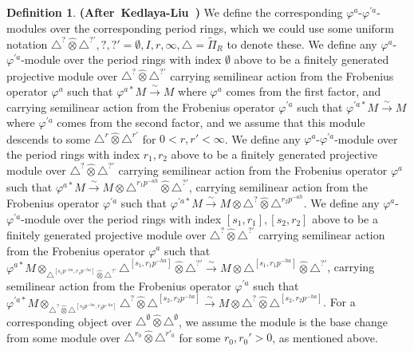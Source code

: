 \documentclass[12pt]{amsart}
\theoremstyle{definition}
\newtheorem{definition}[theorem]{Definition}
\numberwithin{equation}{section}
\begin{document}
\begin{definition} \mbox{\bf{(After Kedlaya-Liu \cite[Definition 4.4.4]{KL2})}}
We define the corresponding $\varphi^a$-$\varphi^{'a}$-modules over the corresponding period rings, which we could use some uniform notation $\triangle^?\widehat{\otimes}\triangle^{?'},?,?'=\emptyset,I,r,\infty,\triangle=\widetilde{\Pi}_{R}$ to denote these. We define any $\varphi^a$-$\varphi^{'a}$-module over the period rings with index $\emptyset$ above to be a finitely generated projective module over $\triangle^?\widehat{\otimes}\triangle^{?'}$ carrying semilinear action from the Frobenius operator $\varphi^a$ such that $\varphi^{a*}M\overset{\sim}{\rightarrow}M$ where $\varphi^a$ comes from the first factor, and carrying semilinear action from the Frobenius operator $\varphi^{'a}$ such that $\varphi^{'a*}M\overset{\sim}{\rightarrow}M$ where $\varphi^{'a}$ comes from the second factor, and we assume that this module descends to some $\triangle^r\widehat{\otimes}\triangle^{r'}$ for $0<r,r'<\infty$. We define any $\varphi^a$-$\varphi^{'a}$-module over the period rings with index $r_1,r_2$ above to be a finitely generated projective module over $\triangle^?\widehat{\otimes}\triangle^{?'}$ carrying semilinear action from the Frobenius operator $\varphi^a$ such that $\varphi^{a*}M\overset{\sim}{\rightarrow}M\otimes \triangle^{r_1p^{-ah}}\widehat{\otimes}\triangle^{?'}$, carrying semilinear action from the Frobenius operator $\varphi^{'a}$ such that $\varphi^{'a*}M\overset{\sim}{\rightarrow}M\otimes \triangle^?\widehat{\otimes}\triangle^{r_2p^{-ah}}$. We define any $\varphi^a$-$\varphi^{'a}$-module over the period rings with index $[s_1,r_1],[s_2,r_2]$ above to be a finitely generated projective module over $\triangle^?\widehat{\otimes}\triangle^{?'}$ carrying semilinear action from the Frobenius operator $\varphi^a$ such that $\varphi^{a*}M\otimes_{\triangle^{[s_1p^{-ha},r_1p^{-ha}]}\widehat{\otimes}\triangle^{?'}} \triangle^{[s_1,r_1p^{-ha}]} \widehat{\otimes}\triangle^{?'}\overset{\sim}{\rightarrow}M\otimes \triangle^{[s_1,r_1p^{-ha}]}\widehat{\otimes}\triangle^{?'}$, carrying semilinear action from the Frobenius operator $\varphi^{'a}$ such that $\varphi^{'a*}M\otimes_{\triangle^?\widehat{\otimes}\triangle^{[s_2p^{-ha},r_2p^{-ha}]}} \triangle^?\widehat{\otimes}\triangle^{[s_2,r_2p^{-ha}]}\overset{\sim}{\rightarrow}M\otimes \triangle^?\widehat{\otimes}\triangle^{[s_2,r_2p^{-ha}]}$. For a corresponding object over $\triangle^\emptyset\widehat{\otimes}\triangle^\emptyset$, we assume the module is the base change from some module over $\triangle^{r_0}\widehat{\otimes}\triangle^{r'_0}$ for some $r_0,r_0'>0$, as mentioned above. 
\end{definition}
\end{document}
